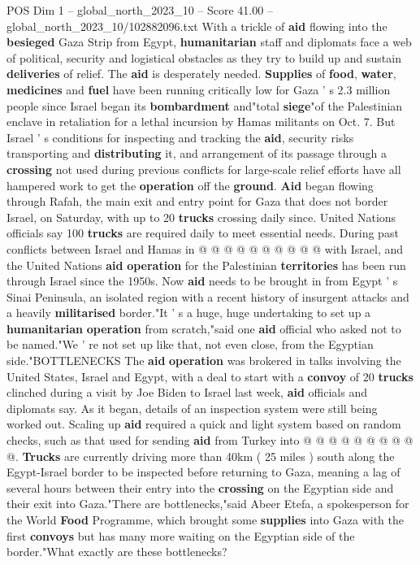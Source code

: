 \begin{textsample}{POS Dim 1 – global\_north\_2023\_10 – Score 41.00 – global\_north\_2023\_10/102882096.txt}  \label{ex:f1_pos_319}
With a trickle of \textbf{aid} flowing into the \textbf{besieged} Gaza Strip from Egypt, \textbf{humanitarian} staff and diplomats face a web of political, security and logistical obstacles as they try to build up and sustain \textbf{deliveries} of relief.
The \textbf{aid} is desperately needed. \textbf{Supplies} of \textbf{food}, \textbf{water}, \textbf{medicines} and \textbf{fuel} have been running critically low for Gaza ' s 2.3 million people since Israel began its \textbf{bombardment} and"total \textbf{siege}"of the Palestinian enclave in retaliation for a lethal incursion by Hamas militants on Oct. 7.
But Israel ' s conditions for inspecting and tracking the \textbf{aid}, security risks transporting and \textbf{distributing} it, and arrangement of its passage through a \textbf{crossing} not used during previous conflicts for large-scale relief efforts have all hampered work to get the \textbf{operation} off the \textbf{ground}. \textbf{Aid} began flowing through Rafah, the main exit and entry point for Gaza that does not border Israel, on Saturday, with up to 20 \textbf{trucks} crossing daily since.
United Nations officials say 100 \textbf{trucks} are required daily to meet essential needs.
During past conflicts between Israel and Hamas in @ @ @ @ @ @ @ @ @ @ with Israel, and the United Nations \textbf{aid} \textbf{operation} for the Palestinian \textbf{territories} has been run through Israel since the 1950s.
Now \textbf{aid} needs to be brought in from Egypt ' s Sinai Peninsula, an isolated region with a recent history of insurgent attacks and a heavily \textbf{militarised} border."It ' s a huge, huge undertaking to set up a \textbf{humanitarian} \textbf{operation} from scratch,"said one \textbf{aid} official who asked not to be named."We ' re not set up like that, not even close, from the Egyptian side."BOTTLENECKS The \textbf{aid} \textbf{operation} was brokered in talks involving the United States, Israel and Egypt, with a deal to start with a \textbf{convoy} of 20 \textbf{trucks} clinched during a visit by Joe Biden to Israel last week, \textbf{aid} officials and diplomats say.
As it began, details of an inspection system were still being worked out.
Scaling up \textbf{aid} required a quick and light system based on random checks, such as that used for sending \textbf{aid} from Turkey into @ @ @ @ @ @ @ @ @ @. \textbf{Trucks} are currently driving more than 40km ( 25 miles ) south along the Egypt-Israel border to be inspected before returning to Gaza, meaning a lag of several hours between their entry into the \textbf{crossing} on the Egyptian side and their exit into Gaza."There are bottlenecks,"said Abeer Etefa, a spokesperson for the World \textbf{Food} Programme, which brought some \textbf{supplies} into Gaza with the first \textbf{convoys} but has many more waiting on the Egyptian side of the border."What exactly are these bottlenecks?

\end{textsample}
